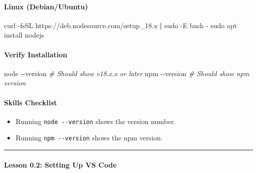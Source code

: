 \documentclass[
  justified,
  openright,
]{tufte-book}
\let\subsection\paragraph
\let\paragraph\paragraph
\newcommand{\KeywordTok}[1]{\textcolor{CodeKeyword}{\textbf{#1}}}  %
\newcommand{\CommentTok}[1]{\textcolor{CodeComment}{\textit{#1}}}  %
\newcommand{\CodeFuncTok}[1]{\textcolor{CodeKeyword}{#1}}           %
\newcommand{\CodeTypeTok}[1]{\textcolor{CodeType}{#1}}              %
\newenvironment{Shaded}{%
  \begin{mdframed}[style=TufteCode]%
}{%
  \end{mdframed}%
}
\let\subsection\paragraph
\let\paragraph\paragraph
\providecommand{\tightlist}{%
  \setlength{\itemsep}{0pt}\setlength{\parskip}{0pt}}
\begin{document}
\paragraph{Linux (Debian/Ubuntu)}\label{linux-debianubuntu-1}

\begin{Shaded}
\begin{Highlighting}[]
curl \CodeTypeTok{{-}fsSL} https://deb.nodesource.com/setup\_18.x \KeywordTok{|} \CodeFuncTok{sudo} \CodeTypeTok{{-}E} bash \CodeTypeTok{{-}}
\CodeFuncTok{sudo} apt install nodejs
\end{Highlighting}
\end{Shaded}

\subsection{Verify Installation}\label{verify-installation}

\begin{Shaded}
\begin{Highlighting}[]
node \CodeTypeTok{{-}{-}version}     \CommentTok{\# Should show v18.x.x or later}
npm \CodeTypeTok{{-}{-}version}      \CommentTok{\# Should show npm version}
\end{Highlighting}
\end{Shaded}

\subsection{Skills Checklist}\label{skills-checklist-52}

\begin{itemize}
\tightlist
\item[$\square$]
  Running \texttt{node\ -\/-version} shows the version number.
\item[$\square$]
  Running \texttt{npm\ -\/-version} shows the npm version.
\end{itemize}

\begin{center}\rule{0.5\linewidth}{0.5pt}\end{center}

\subsection{Lesson 0.2: Setting Up VS
Code}\label{lesson-0.2-setting-up-vs-code}
\end{document}
